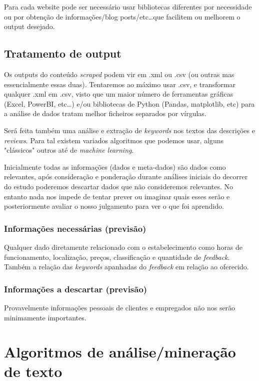 \documentclass[a4paper,10pt]{article}
\begin{document}
Para cada website pode ser necessário usar bibliotecas diferentes por necessidade ou por obtenção de informações/blog posts/etc\ldots que facilitem ou melhorem o output desejado.

\subsection{Tratamento de output}

Os outputs do conteúdo \textit{scraped} podem vir em .xml ou .csv (ou outras mas essencialmente essas duas).
Tentaremos ao máximo usar .csv, e transformar qualquer .xml em .csv, visto que um maior número de ferramentas gráficas (Excel, PowerBI, etc\ldots) e/ou bibliotecas de Python (Pandas, matplotlib, etc) para a análise de dados tratam melhor ficheiros separados por vírgulas.

Será feita também uma análise e extração de \textit{keywords} nos textos das descrições e \textit{reviews}.
Para tal existem variados algoritmos que podemos usar, alguns "clássicos" outros até de \textit{machine learning}.

Inicialmente todas as informações (dados e meta-dados) são dados como relevantes, após consideração e ponderação durante análises iniciais do decorrer do estudo poderemos descartar dados que não consideremos relevantes.
No entanto nada nos impede de tentar prever ou imaginar quais esses serão e posteriormente avaliar o nosso julgamento para ver o que foi aprendido.

\subsubsection{Informações necessárias (previsão)}

Qualquer dado diretamente relacionado com o estabelecimento como horas de funcionamento, localização, preços, classificação e quantidade de \textit{feedback}.
Também a relação das \textit{keywords} apanhadas do \textit{feedback} em relação ao oferecido.

\subsubsection{Informações a descartar (previsão)}

Provavelmente informações pessoais de clientes e empregados não nos serão minimamente importantes.

\section{Algoritmos de análise/mineração de texto}
\end{document}

